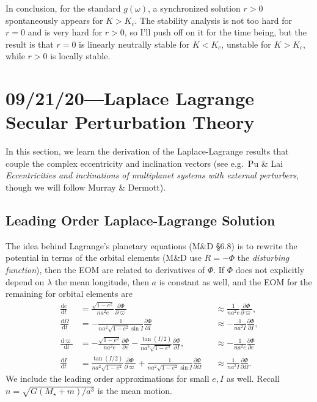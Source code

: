 \documentclass[11pt,
        usenames, %
        dvipsnames %
    ]{article}
\newcommand*{\rd}[2]{\frac{\mathrm{d}#1}{\mathrm{d}#2}}
\newcommand*{\pd}[2]{\frac{\partial#1}{\partial#2}}
\begin{document}
In conclusion, for the standard $g(\omega)$, a synchronized solution $r > 0$
spontaneously appears for $K > K_c$. The stability analysis is not too hard for
$r = 0$ and is very hard for $r > 0$, so I'll push off on it for the time being,
but the result is that $r = 0$ is linearly neutrally stable for $K < K_c$,
unstable for $K > K_c$, while $r  > 0$ is locally stable.

\section{09/21/20---Laplace Lagrange Secular Perturbation Theory}

In this section, we learn the derivation of the Laplace-Lagrange results that
couple the complex eccentricity and inclination vectors (see e.g.\ Pu \& Lai
\emph{Eccentricities and inclinations of multiplanet systems with external
perturbers}, though we will follow Murray \& Dermott).

\subsection{Leading Order Laplace-Lagrange Solution}

The idea behind Lagrange's planetary equations (M\&D \S6.8) is to rewrite the
potential in terms of the orbital elements (M\&D use $R = -\Phi$ the
\emph{disturbing function}), then the EOM are related to derivatives of $\Phi$.
If $\Phi$ does not explicitly depend on $\lambda$ the mean longitude, then $a$
is constant as well, and the EOM for the remaining for orbital elements are
\begin{subequations}\label{se:lagrange_planetary}
    \begin{align}
        \rd{e}{t} &= \frac{\sqrt{1 - e^2}}{na^2e}\pd{\Phi}{\varpi}
            &&\approx \frac{1}{na^2e}\pd{\Phi}{\varpi},\\
        \rd{\Omega}{t} &= -\frac{1}{na^2\sqrt{1 - e^2}\sin I}\pd{\Phi}{I}
            &&\approx -\frac{1}{na^2 I}\pd{\Phi}{I},\\
        \rd{\varpi}{t} &= -\frac{\sqrt{1 - e^2}}{na^2e}\pd{\Phi}{e}
            - \frac{\tan (I/2)}{na^2\sqrt{1 - e^2}}\pd{\Phi}{I},
            &&\approx -\frac{1}{na^2e}\pd{\Phi}{e}\\
        \rd{I}{t} &= \frac{\tan(I/2)}{na^2\sqrt{1 - e^2}}\pd{\Phi}{\varpi}
            + \frac{1}{na^2\sqrt{1 - e^2}\sin I}\pd{\Phi}{\Omega}
            &&\approx \frac{1}{na^2I}\pd{\Phi}{\Omega}.
    \end{align}
\end{subequations}
We include the leading order approximations for small $e, I$ as well. Recall $n
= \sqrt{G(M_\star + m) / a^3}$ is the mean motion.
\end{document}
